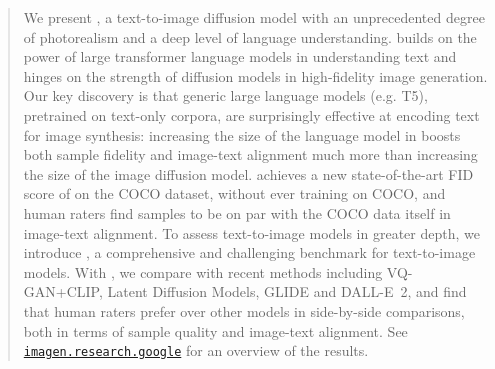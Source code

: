 \begin{abstract}
We present \name, a text-to-image diffusion model with an unprecedented degree of photorealism and a deep level of language understanding.
\name builds on the power of large transformer language models in understanding text and hinges on the strength of diffusion models in high-fidelity image generation.
Our key discovery is that generic large language models (e.g. T5), pretrained on text-only corpora, are surprisingly
effective at encoding text for image synthesis: increasing the size of the language model in \name boosts both sample fidelity and image-text
alignment much more than increasing the size of the image diffusion model.
\name achieves a new state-of-the-art FID score of \ourmscocofid on the COCO dataset, without ever training on COCO, and human raters find \name samples to be on par with the COCO data itself in image-text alignment.
To assess text-to-image models in greater depth, we introduce \benchmarkname, a comprehensive and challenging benchmark for text-to-image models. 
With \benchmarkname, we compare \name with recent methods including VQ-GAN+CLIP, Latent Diffusion Models, GLIDE and DALL-E~2, and find that human raters prefer \name over other models in side-by-side comparisons, both in terms of sample quality and image-text alignment. See \href{https://imagen.research.google/}{\texttt{imagen.research.google}} for an overview of the results.





\end{abstract}